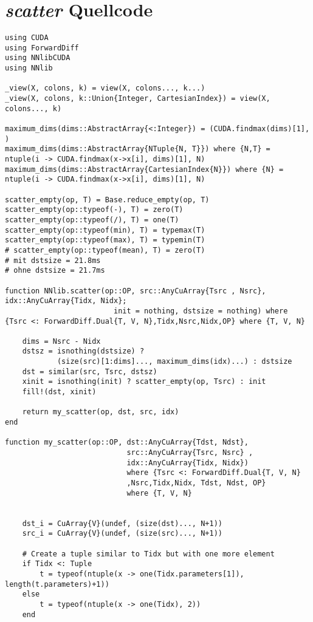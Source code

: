 \section{\textit{scatter} Quellcode}
\label{code_subfig}
\lstset{language=Julia,style=nonumbers}
\begin{lstlisting}
using CUDA
using ForwardDiff
using NNlibCUDA
using NNlib

_view(X, colons, k) = view(X, colons..., k...)
_view(X, colons, k::Union{Integer, CartesianIndex}) = view(X, colons..., k)
 
maximum_dims(dims::AbstractArray{<:Integer}) = (CUDA.findmax(dims)[1], )
maximum_dims(dims::AbstractArray{NTuple{N, T}}) where {N,T} = 
ntuple(i -> CUDA.findmax(x->x[i], dims)[1], N)
maximum_dims(dims::AbstractArray{CartesianIndex{N}}) where {N} = 
ntuple(i -> CUDA.findmax(x->x[i], dims)[1], N)
 
scatter_empty(op, T) = Base.reduce_empty(op, T)
scatter_empty(op::typeof(-), T) = zero(T)
scatter_empty(op::typeof(/), T) = one(T)
scatter_empty(op::typeof(min), T) = typemax(T)
scatter_empty(op::typeof(max), T) = typemin(T)
# scatter_empty(op::typeof(mean), T) = zero(T)
# mit dstsize = 21.8ms
# ohne dstsize = 21.7ms

function NNlib.scatter(op::OP, src::AnyCuArray{Tsrc , Nsrc}, idx::AnyCuArray{Tidx, Nidx}; 
                         init = nothing, dstsize = nothing) where {Tsrc <: ForwardDiff.Dual{T, V, N},Tidx,Nsrc,Nidx,OP} where {T, V, N}
    
    dims = Nsrc - Nidx 
    dstsz = isnothing(dstsize) ? 
            (size(src)[1:dims]..., maximum_dims(idx)...) : dstsize 
    dst = similar(src, Tsrc, dstsz) 
    xinit = isnothing(init) ? scatter_empty(op, Tsrc) : init  
    fill!(dst, xinit) 
    
    return my_scatter(op, dst, src, idx)        
end

function my_scatter(op::OP, dst::AnyCuArray{Tdst, Ndst}, 
                            src::AnyCuArray{Tsrc, Nsrc} , 
                            idx::AnyCuArray{Tidx, Nidx}) 
                            where {Tsrc <: ForwardDiff.Dual{T, V, N}
                            ,Nsrc,Tidx,Nidx, Tdst, Ndst, OP} 
                            where {T, V, N}   


    dst_i = CuArray{V}(undef, (size(dst)..., N+1)) 
    src_i = CuArray{V}(undef, (size(src)..., N+1))
    
    # Create a tuple similar to Tidx but with one more element 
    if Tidx <: Tuple
        t = typeof(ntuple(x -> one(Tidx.parameters[1]), length(t.parameters)+1))
    else
        t = typeof(ntuple(x -> one(Tidx), 2))
    end


\end{lstlisting}
